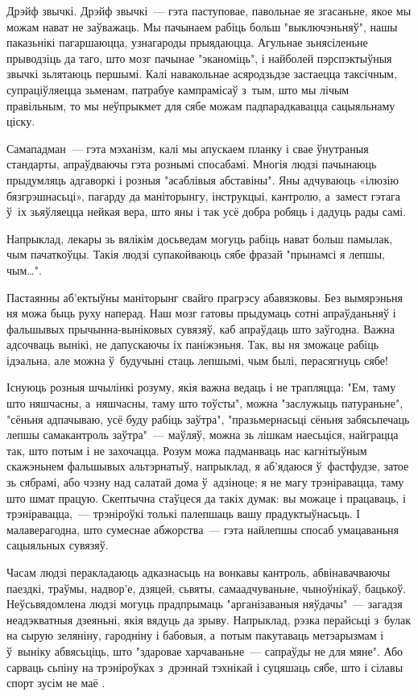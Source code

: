 Дрэйф звычкі. Дрэйф звычкі~--- гэта паступовае, павольнае яе згасаньне, якое мы можам нават не заўважаць. Мы пачынаем рабіць больш "выключэньняў", нашы паказьнікі пагаршаюцца, узнагароды прыядаюцца. Агульнае зьнясіленьне прыводзіць да таго, што мозг пачынае "эканоміць", і найболей пэрспэктыўныя звычкі зьлятаюць першымі. Калі навакольнае асяродзьдзе застаецца таксічным, супраціўляецца зьменам, патрабуе кампрамісаў з~тым, што мы лічым правільным, то мы неўпрыкмет для сябе можам падпарадкавацца сацыяльнаму ціску.

Самападман~--- гэта мэханізм, калі мы апускаем планку і свае ўнутраныя стандарты, апраўдваючы гэта рознымі спосабамі. Многія людзі пачынаюць прыдумляць адгаворкі і розныя "асаблівыя абставіны". Яны адчуваюць «ілюзію бязгрэшнасьці», пагарду да маніторынгу, інструкцыі, кантролю, а~замест гэтага ў~іх зьяўляецца нейкая вера, што яны і так усё добра робяць і дадуць рады самі.

Напрыклад, лекары зь вялікім досьведам могуць рабіць нават больш памылак, чым пачаткоўцы. Такія людзі супакойваюць сябе фразай "прынамсі я лепшы, чым…".

Пастаянны аб'ектыўны маніторынг свайго прагрэсу абавязковы. Без вымярэньня ня можа быць руху наперад. Наш мозг гатовы прыдумаць сотні апраўданьняў і фальшывых прычынна-выніковых сувязяў, каб апраўдаць што заўгодна. Важна адсочваць вынікі, не дапускаючы іх паніжэньня. Так, вы ня зможаце рабіць ідэальна, але можна ў~будучыні стаць лепшымі, чым былі, перасягнуць сябе!

Існуюць розныя шчылінкі розуму, якія важна ведаць і не трапляцца: "Ем, таму што няшчасны, а~няшчасны, таму што тоўсты", можна "заслужыць патураньне", "сёньня адпачываю, усё буду рабіць заўтра", "празьмернасьці сёньня забясьпечаць лепшы самакантроль заўтра"~--- маўляў, можна зь лішкам наесьціся, найграцца так, што потым і не захочацца. Розум можа падманваць нас кагнітыўным скажэньнем фальшывых альтэрнатыў, напрыклад, я аб'ядаюся ў~фастфудзе, затое зь сябрамі, або чэзну над салатай дома ў~адзіноце; я не магу трэніравацца, таму што шмат працую. Скептычна стаўцеся да такіх думак: вы можаце і працаваць, і трэніравацца,~--- трэніроўкі толькі палепшаць вашу прадуктыўнасьць. І малаверагодна, што сумеснае абжорства~--- гэта найлепшы спосаб умацаваньня сацыяльных сувязяў.

Часам людзі перакладаюць адказнасьць на вонкавы кантроль, абвінавачваючы паездкі, траўмы, надвор'е, дзяцей, сьвяты, самаадчуваньне, чыноўнікаў, бацькоў. Неўсьвядомлена людзі могуць прадпрымаць "арганізаваныя няўдачы"~--- загадзя неадэкватныя дзеяньні, якія вядуць да зрыву. Напрыклад, рэзка перайсьці з~булак на сырую зеляніну, гародніну і бабовыя, а~потым пакутаваць метэарызмам і ў~выніку абвясьціць, што "здаровае харчаваньне~--- сапраўды не для мяне". Або сарваць сьпіну на трэніроўках з~дрэннай тэхнікай і суцяшаць сябе, што і сілавы спорт зусім не маё .

